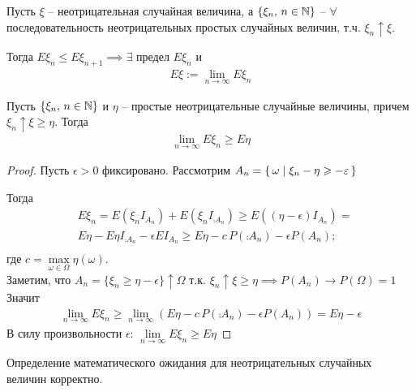 
\begin{definition}
  Пусть $\xi$ -- неотрицательная случайная величина, 
  а $\{ \xi_n,\, n \in \mathbb{N} \}$ -- $\forall$ последовательность неотрицательных 
  простых случайных величин, т.ч. $\xi_n \uparrow \xi$. 

  Тогда $E \xi_n \leq E \xi_{n + 1} \implies \exists$ предел $E \xi_n$ и
  \begin{align*}
    E \xi := \lim_{n \to \infty} E \xi_n
  \end{align*}
\end{definition}

\begin{lemma}
  Пусть $\{ \xi_n,\, n \in \mathbb{N} \}$ и $\eta$ -- простые неотрицательные случайные величины, 
  причем $\xi_n \uparrow \xi \geq \eta$. Тогда 
  \begin{align*}
    \lim_{n \to \infty} E \xi_n \geq E \eta
  \end{align*}
\end{lemma}

\begin{proof}
  Пусть $\epsilon > 0$ фиксировано. 
  Рассмотрим $A_n = \left\{ \, \omega \mid \xi_n - \eta \geqslant -\varepsilon \, \right\}$

  Тогда
  \begin{align*}
    &E\xi_n = E(\xi_n I_{A_n}) + E(\xi_n I_{\comp{A}_n}) \geq E((\eta - \epsilon) I_{A_n}) = \\
    &E \eta - E\eta I_{\comp{A}_n} - \epsilon E I_{A_n} \geq 
    E\eta - c\, P(\comp{A}_n) - \epsilon P(A_n);\\
  \end{align*}
  где $c = \max\limits_{\omega \in \Omega} \eta(\omega)$. \\
  Заметим, что $A_n = \{ \xi_n \geq \eta - \epsilon \} \uparrow \Omega$ 
  т.к. $\xi_n \uparrow \xi \geq \eta \implies P(A_n) \rightarrow P(\Omega) = 1$\\
  Значит
  \begin{align*}
    \lim_{n \to \infty} E\xi_n \geq \lim_{n \to \infty} (E\eta - c\, P(\comp{A}_n) - \epsilon P(A_n)) = E\eta - \epsilon
  \end{align*}
  В силу произвольности $\epsilon$: $\lim\limits_{n \to \infty} E \xi_n \geq E \eta$
\end{proof}

\begin{corollary}
  Определение математического ожидания для неотрицательных случайных величин корректно.
\end{corollary}

